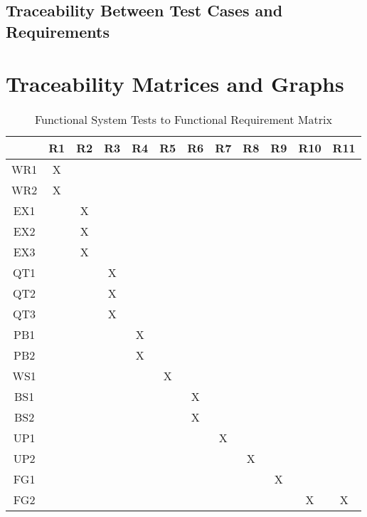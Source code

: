\documentclass[12pt, titlepage]{article}
\begin{document}
	\subsection{Traceability Between Test Cases and Requirements}
	
	\newpage
		\section{Traceability Matrices and Graphs}
	
	\begin{table}[h!]
		\centering
		\begin{tabular}{|c|c|c|c|c|c|c|c|c|c|c|c|}
			\hline
			& R1 & R2 & R3 & R4 & R5 & R6 & R7 & R8 & R9 & R10 & R11 \\ \hline
			WR1 &X & & & & & & & & & & \\ \hline
			WR2 &X & & & & & & & & & & \\ \hline
			EX1 & &X & & & & & & & & & \\ \hline 
			EX2 & &X & & & & & & & & & \\ \hline
			EX3 & &X & & & & & & & & &\\ \hline 
			QT1 & & &X & & & & & & & & \\ \hline 
			QT2 & & &X & & & & & & & & \\ \hline 
			QT3 & & &X & & & & & & & & \\ \hline 
			PB1 & & & &X & & & & & & & \\ \hline 
			PB2 & & & &X & & & & & & & \\ \hline 
			WS1 & & & & &X & & & & & & \\ \hline 
			BS1 & & & & & &X & & & & & \\ \hline 
			BS2 & & & & & &X & & & & & \\ \hline 
			UP1 & & & & & & &X & & & & \\ \hline 
			UP2 & & & & & & & &X & & & \\ \hline 
			FG1 & & & & & & & & &X & & \\ \hline 
			FG2 & & & & & & & & & &X &X \\ \hline 	
		\end{tabular}
		\caption{Functional System Tests to Functional Requirement Matrix}
		\label{Table:R_trace}
	\end{table}
\end{document}
